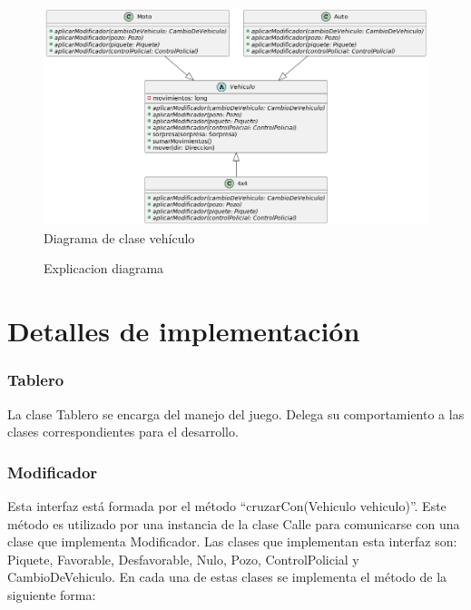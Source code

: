 \documentclass[titlepage,a4paper]{article}
\begin{document}
\begin{figure}[H]
  \centering
  \includegraphics[width=1\textwidth]{diagramas/vehiculos.png}
  \caption{\label{fig:seq04} Diagrama de clase vehículo}
\end{figure}

\begin{figure}[H]
\centering
\caption{\label{fig:class01}Explicacion diagrama}
\end{figure}

\section{Detalles de implementación}\label{sec:implementacion}

\subsubsection[Tablero]{Tablero}

La clase Tablero se encarga del manejo del juego. Delega su comportamiento a las clases correspondientes para el desarrollo.

\subsubsection[Modificador]{Modificador}

Esta interfaz está formada por el método “cruzarCon(Vehiculo vehiculo)”. Este método es utilizado por una instancia de la clase Calle para comunicarse con una clase que implementa Modificador.
Las clases que implementan esta interfaz son: Piquete, Favorable, Desfavorable, Nulo, Pozo, ControlPolicial y CambioDeVehiculo. En cada una de estas clases se implementa el método de la siguiente forma:
\end{document}
